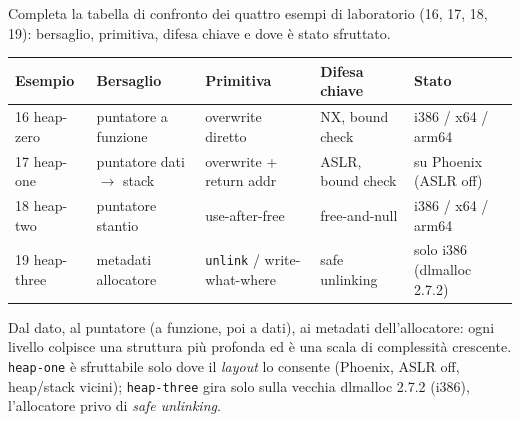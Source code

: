 \question[6]
Completa la tabella di confronto dei quattro esempi di laboratorio (16, 17, 18, 19): bersaglio, primitiva, difesa chiave e dove è stato sfruttato.
\begin{solution}
\begin{center}\small
\begin{tabular}{@{}lllll@{}}
\toprule
Esempio & Bersaglio & Primitiva & Difesa chiave & Stato\\
\midrule
16 heap-zero  & puntatore a funzione & overwrite diretto      & NX, bound check   & i386 / x64 / arm64\\
17 heap-one   & puntatore dati $\to$ stack & overwrite + return addr & ASLR, bound check & su Phoenix (ASLR off)\\
18 heap-two   & puntatore stantio    & use-after-free         & free-and-null     & i386 / x64 / arm64\\
19 heap-three & metadati allocatore  & \lstinline|unlink| / write-what-where & safe unlinking & solo i386 (dlmalloc 2.7.2)\\
\bottomrule
\end{tabular}
\end{center}
Dal dato, al puntatore (a funzione, poi a dati), ai metadati dell'allocatore: ogni livello colpisce una struttura più profonda ed è una scala di complessità crescente. \lstinline|heap-one| è sfruttabile solo dove il \emph{layout} lo consente (Phoenix, ASLR off, heap/stack vicini); \lstinline|heap-three| gira solo sulla vecchia dlmalloc 2.7.2 (i386), l'allocatore privo di \emph{safe unlinking}.
\end{solution}

